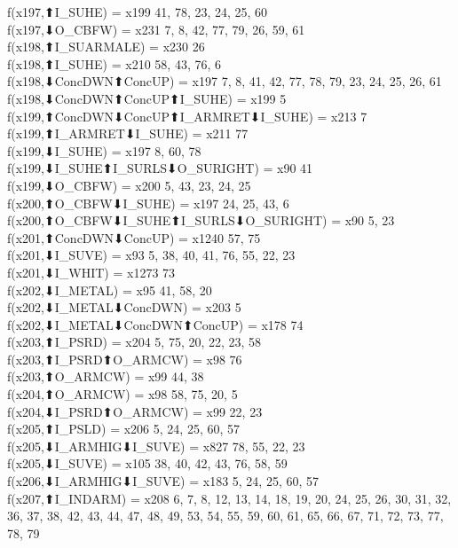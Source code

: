 f(x197,⬆I_SUHE) = x199 {41, 78, 23, 24, 25, 60} \\
f(x197,⬇O_CBFW) = x231 {7, 8, 42, 77, 79, 26, 59, 61} \\
f(x198,⬆I_SUARMALE) = x230 {26} \\
f(x198,⬆I_SUHE) = x210 {58, 43, 76, 6} \\
f(x198,⬇ConcDWN⬆ConcUP) = x197 {7, 8, 41, 42, 77, 78, 79, 23, 24, 25, 26, 61} \\
f(x198,⬇ConcDWN⬆ConcUP⬆I_SUHE) = x199 {5} \\
f(x199,⬆ConcDWN⬇ConcUP⬆I_ARMRET⬇I_SUHE) = x213 {7} \\
f(x199,⬆I_ARMRET⬇I_SUHE) = x211 {77} \\
f(x199,⬇I_SUHE) = x197 {8, 60, 78} \\
f(x199,⬇I_SUHE⬆I_SURLS⬇O_SURIGHT) = x90 {41} \\
f(x199,⬇O_CBFW) = x200 {5, 43, 23, 24, 25} \\
f(x200,⬆O_CBFW⬇I_SUHE) = x197 {24, 25, 43, 6} \\
f(x200,⬆O_CBFW⬇I_SUHE⬆I_SURLS⬇O_SURIGHT) = x90 {5, 23} \\
f(x201,⬆ConcDWN⬇ConcUP) = x1240 {57, 75} \\
f(x201,⬇I_SUVE) = x93 {5, 38, 40, 41, 76, 55, 22, 23} \\
f(x201,⬇I_WHIT) = x1273 {73} \\
f(x202,⬇I_METAL) = x95 {41, 58, 20} \\
f(x202,⬇I_METAL⬇ConcDWN) = x203 {5} \\
f(x202,⬇I_METAL⬇ConcDWN⬆ConcUP) = x178 {74} \\
f(x203,⬆I_PSRD) = x204 {5, 75, 20, 22, 23, 58} \\
f(x203,⬆I_PSRD⬆O_ARMCW) = x98 {76} \\
f(x203,⬆O_ARMCW) = x99 {44, 38} \\
f(x204,⬆O_ARMCW) = x98 {58, 75, 20, 5} \\
f(x204,⬇I_PSRD⬆O_ARMCW) = x99 {22, 23} \\
f(x205,⬆I_PSLD) = x206 {5, 24, 25, 60, 57} \\
f(x205,⬇I_ARMHIG⬇I_SUVE) = x827 {78, 55, 22, 23} \\
f(x205,⬇I_SUVE) = x105 {38, 40, 42, 43, 76, 58, 59} \\
f(x206,⬇I_ARMHIG⬇I_SUVE) = x183 {5, 24, 25, 60, 57} \\
f(x207,⬆I_INDARM) = x208 {6, 7, 8, 12, 13, 14, 18, 19, 20, 24, 25, 26, 30, 31, 32, 36, 37, 38, 42, 43, 44, 47, 48, 49, 53, 54, 55, 59, 60, 61, 65, 66, 67, 71, 72, 73, 77, 78, 79} \\
